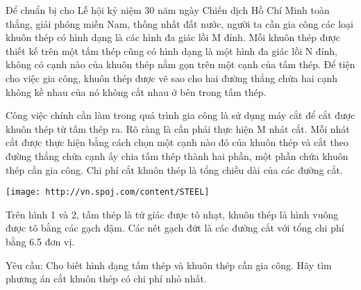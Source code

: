 Để chuẩn bị cho Lễ hội kỷ niệm 30 năm ngày Chiến dịch Hồ Chí Minh toàn thắng, giải phóng miền Nam, thống nhất đất nước, người ta cần gia   công các loại khuôn thép có hình dạng là các hình đa giác lồi M đỉnh. Mỗi khuôn thép được thiết kế trên một tấm thép cũng có hình dạng là một hình đa   giác lồi N đỉnh, không có cạnh nào của khuôn thép nằm gọn trên một cạnh của tấm thép.   Để tiện cho việc gia công, khuôn thép được vẽ sao cho hai   đường thẳng chứa hai cạnh không kề nhau của nó không cắt nhau ở bên trong tấm thép.

   Công việc chính cần làm trong quá trình gia công là sử dụng máy cắt để cắt được khuôn thép từ tấm thép ra. Rõ ràng là cần phải thực hiện M nhát   cắt. Mỗi nhát cắt được thực hiện bằng cách chọn một cạnh nào đó của khuôn thép và cắt theo đường thẳng chứa cạnh ấy chia tấm thép thành hai phần,   một phần chứa khuôn thép cần gia công. Chi phí cắt khuôn thép là tổng chiều dài của các đường cắt.  


\texttt{[image: http://vn.spoj.com/content/STEEL]}

   Trên hình 1 và 2, tấm thép là tứ giác được tô nhạt, khuôn thép là hình vuông được tô bằng các gạch đậm. Các nét gạch đứt là các đường cắt với   tổng chi phí bằng 6.5 đơn vị.  

   Yêu cầu: Cho biết hình dạng tấm thép và khuôn thép cần gia công. Hãy tìm phương án cắt khuôn thép có chi phí nhỏ nhất.